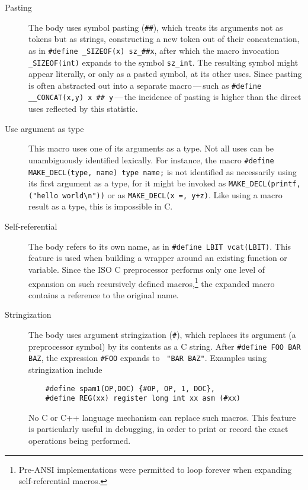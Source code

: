 \begin{description}
\item[Pasting]\label{def:pasting}
  The body uses symbol pasting ({\tt \#\#}), which treats its arguments not
  as tokens but as strings, constructing a new token out of their
  concatenation, as in {\tt \#define \verb|_SIZEOF|(x) \verb|sz_|\#\#x},
  after which the macro invocation {\tt \verb|_SIZEOF|(int)} expands to the
  symbol {\tt sz_int}.  The resulting symbol might appear literally, or
  only as a pasted symbol, at its other uses.  Since pasting is often
  abstracted out into a separate macro\,---\,such as {\tt \#define
  \verb|__CONCAT|(x,y) x \#\# y}\,---\,the incidence of pasting is higher
than the direct uses reflected by this statistic.

\item[Use argument as type]
  This macro uses one of its arguments as a type.  Not all uses can be
  unambiguously identified lexically.  For instance, the macro 
  {\tt \#define \verb|MAKE_DECL|(type, name) type name;}
  is not identified as necessarily using its first argument as a type, for
  it might be invoked as {\tt \verb|MAKE_DECL|(printf, ("hello
  world\verb|\|n"))} or as {\tt \verb|MAKE_DECL|(x =, y+z)}.
  Like using a macro result
  as a type, this is impossible in C\@.

\item[Self-referential]
  The body refers to its own name, as in {\tt \#define LBIT vcat(LBIT)}.
  This feature is used when building a wrapper around an existing function
  or variable.  Since the ISO C preprocessor performs only one level of
  expansion on such recursively defined macros,\footnote{Pre-ANSI
    implementations were permitted to loop forever when expanding
    self-referential macros.} the expanded macro contains a reference to
  the original name.

\item[Stringization]
  The body uses argument stringization ({\tt \#}), which replaces its
  argument (a preprocessor symbol) by its contents as a C string.  After
  {\tt \#define FOO BAR BAZ}, the expression {\tt \#FOO} expands to {\tt
  "BAR~BAZ"}.  Examples using stringization include
\begin{verbatim}
    #define spam1(OP,DOC) {#OP, OP, 1, DOC},
    #define REG(xx) register long int xx asm (#xx)
\end{verbatim}
  No C or C++ language mechanism can replace such macros.  This feature is
  particularly useful in debugging, in order to print or record the exact
  operations being performed.

\end{description}


